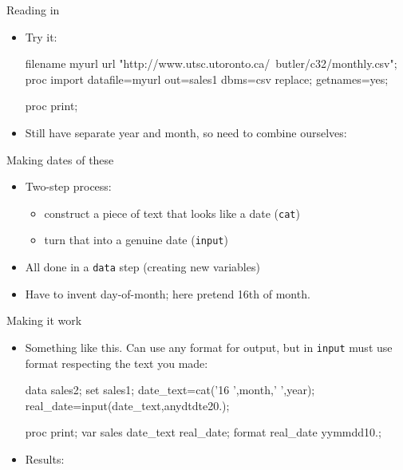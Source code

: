 \documentclass[unknownkeysallowed]{beamer}\usepackage[]{graphicx}\usepackage[]{color}
\begin{document}
\begin{frame}[fragile]{Reading in}
  \begin{itemize}
    
    \item Try it:
    
    \begin{Sascode}[store=jahaq]
filename myurl url 
  "http://www.utsc.utoronto.ca/~butler/c32/monthly.csv";
proc import
  datafile=myurl
  out=sales1
  dbms=csv
  replace;
  getnames=yes;
  
proc print;  
    \end{Sascode}

  \item Still have separate year and month, so need to combine ourselves:

    
  \end{itemize}
\end{frame}

\begin{frame}[fragile]{Making dates of these}
  
  \begin{itemize}
  \item Two-step process:
    \begin{itemize}
    \item construct a piece of text that looks like a date (\texttt{cat})
    \item turn that into a genuine date (\texttt{input})
    \end{itemize}
  \item All done in a \texttt{data} step (creating new variables)
  \item Have to invent day-of-month; here pretend 16th of month.
  \end{itemize}
  
\end{frame}

\begin{frame}[fragile]{Making it work}
  \begin{itemize}
  \item Something like this. Can use any format for output, but in
    \texttt{input} must use format respecting the text you made:
    
    \begin{small}
    \begin{Sascode}[store=nubiv]
data sales2;
  set sales1;
  date_text=cat('16 ',month,' ',year);
  real_date=input(date_text,anydtdte20.);
  
proc print;  
  var sales date_text real_date;
  format real_date yymmdd10.;
    \end{Sascode}
      
    \end{small}
    
    \item Results:
      
  \end{itemize}
\end{frame}
\end{document}
